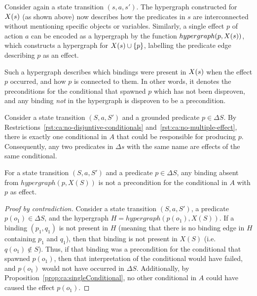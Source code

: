 \documentclass[../Master.tex]{subfiles}
\begin{document}
Consider again a state transition $\left( s, a, s' \right)$. The hypergraph constructed for $X(s)$ (as shown above) now describes how the predicates in $s$ are interconnected without mentioning specific objects or variables. Similarly, a single effect $p$ of action $a$ can be encoded as a hypergraph by the function $hypergraph(p,X(s))$, which constructs a hypergraph for $X(s) \cup \{p\}$, labelling the predicate edge describing $p$ as an effect.

Such a hypergraph describes which bindings were present in $X(s)$ when the effect $p$ occurred, and how $p$ is connected to them. In other words, it denotes the preconditions for the conditional that spawned $p$ which has not been disproven, and any binding \textit{not} in the hypergraph is disproven to be a precondition.

\begin{proposition}\label{prop:ca:singleConditional}
    Consider a state transition $\left(S, a, S'\right)$ and a grounded predicate $p \in \Delta S$. By Restrictions~\ref{rst:ca:no-disjuntive-conditionals} and~\ref{rst:ca:no-multiple-effect}, there is exactly one conditional in $A$ that could be responsible for producing $p$. Consequently, any two predicates in $\Delta s$ with the same name are effects of the same conditional.
\end{proposition}

\begin{proposition}\label{prop:ca:disprovenHg}
    For a state transition $\left( S, a, S' \right)$ and a predicate $p \in \Delta S$, any binding absent from $hypergraph \left( p, X(S) \right)$ is not a precondition for the conditional in $A$ with $p$ as effect. 
\end{proposition}

\begin{proof}[Proof by contradiction]
    Consider a state transition $\left( S, a, S' \right)$, a predicate $p \left( o_1 \right) \in \Delta S$, and the hypergraph $H = hypergraph\left( p\left(o_1\right), X(S) \right)$. If a binding $(p_1, q_1)$ is not present in $H$ (meaning that there is no binding edge in $H$ containing $p_1$ and $q_1$), then that binding is not present in $X(S)$ (i.e.\ $q\left(o_1\right) \notin S$). Thus, if that binding was a precondition for the conditional that spawned $p\left(o_1\right)$, then that interpretation of the conditional would have failed, and $p\left( o_1 \right)$ would not have occurred in $\Delta S$. Additionally, by Proposition~\ref{prop:ca:singleConditional}, no other conditional in $A$ could have caused the effect $p \left(o_1\right)$.
\end{proof}
\end{document}
